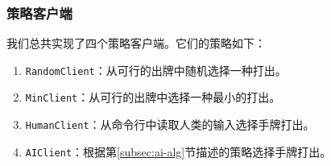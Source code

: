 \documentclass[a4paper]{ctexart}
\begin{document}
\subsubsection{策略客户端}
我们总共实现了四个策略客户端。它们的策略如下：
\begin{enumerate}
  \item
  \texttt{RandomClient}：从可行的出牌中随机选择一种打出。

  \item
  \texttt{MinClient}：从可行的出牌中选择一种最小的打出。

  \item
  \texttt{HumanClient}：从命令行中读取人类的输入选择手牌打出。

  \item 
  \texttt{AIClient}：根据第\ref{subsec:ai-alg}节描述的策略选择手牌打出。
\end{enumerate}
\end{document}
